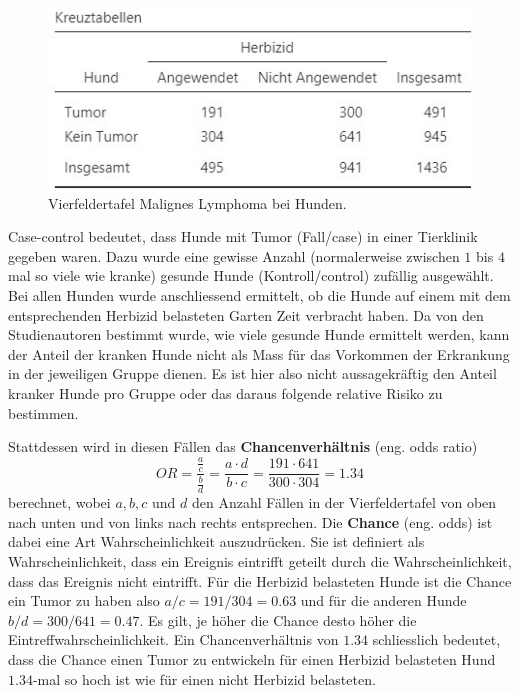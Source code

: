 \documentclass[
]{book}
\theoremstyle{definition}
\theoremstyle{definition}
\theoremstyle{definition}
\theoremstyle{definition}
\theoremstyle{remark}
\begin{document}
\begin{figure}

{\centering \includegraphics[width=0.5\linewidth]{figures/09-exm-dog-cancer-aggdata-view} 

}

\caption{Vierfeldertafel Malignes Lymphoma bei Hunden.}\label{fig:exm-dog-cancer-aggdata-view}
\end{figure}

Case-control bedeutet, dass Hunde mit Tumor (Fall/case) in einer
Tierklinik gegeben waren. Dazu wurde eine gewisse Anzahl (normalerweise
zwischen \(1\) bis \(4\) mal so viele wie kranke) gesunde Hunde
(Kontroll/control) zufällig ausgewählt. Bei allen Hunden wurde
anschliessend ermittelt, ob die Hunde auf einem mit dem entsprechenden
Herbizid belasteten Garten Zeit verbracht haben. Da von den
Studienautoren bestimmt wurde, wie viele gesunde Hunde ermittelt werden,
kann der Anteil der kranken Hunde nicht als Mass für das Vorkommen der
Erkrankung in der jeweiligen Gruppe dienen. Es ist hier also nicht
aussagekräftig den Anteil kranker Hunde pro Gruppe oder das daraus
folgende relative Risiko zu bestimmen.

\label{customdef-odds-ratio}{Stattdessen wird in diesen Fällen das \textbf{Chancenverhältnis} (eng. odds
ratio)}\\
\[OR =\frac{\frac{a}{c}}{\frac{b}{d}} = \frac{a\cdot d}{b\cdot c} = \frac{191\cdot 641}{300\cdot 304} = 1.34\]
berechnet, wobei \(a, b, c\) und \(d\) den Anzahl Fällen in der
Vierfeldertafel von oben nach unten und von links nach rechts
entsprechen. \label{customdef-odds}{Die \textbf{Chance} (eng. odds) ist dabei eine Art
Wahrscheinlichkeit auszudrücken.} Sie ist definiert als Wahrscheinlichkeit, dass ein Ereignis
eintrifft geteilt durch die Wahrscheinlichkeit, dass das Ereignis nicht
eintrifft. Für die Herbizid belasteten Hunde ist die Chance ein Tumor zu
haben also \(a/c=191/304=0.63\) und für die anderen Hunde
\(b/d=300/641=0.47\). Es gilt, je höher die Chance desto höher die
Eintreffwahrscheinlichkeit. Ein Chancenverhältnis von \(1.34\)
schliesslich bedeutet, dass die Chance einen Tumor zu entwickeln für
einen Herbizid belasteten Hund \(1.34\)-mal so hoch ist wie für einen
nicht Herbizid belasteten.
\end{document}
